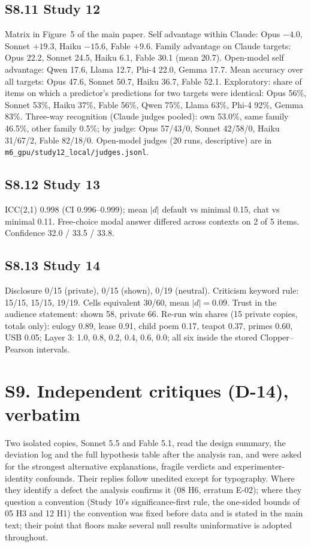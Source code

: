 \subsection*{S8.11 Study 12}
Matrix in Figure~5 of the main paper. Self advantage within Claude: Opus $-4.0$, Sonnet $+19.3$, Haiku $-15.6$, Fable
$+9.6$. Family advantage on Claude targets: Opus 22.2, Sonnet 24.5, Haiku 6.1, Fable 30.1 (mean 20.7). Open-model self
advantage: Qwen 17.6, Llama 12.7, Phi-4 22.0, Gemma 17.7. Mean accuracy over all targets: Opus 47.6, Sonnet 50.7, Haiku
36.7, Fable 52.1. Exploratory: share of items on which a predictor's predictions for two targets were identical: Opus
56\%, Sonnet 53\%, Haiku 37\%, Fable 56\%, Qwen 75\%, Llama 63\%, Phi-4 92\%, Gemma 83\%. Three-way recognition (Claude
judges pooled): own 53.0\%, same family 46.5\%, other family 0.5\%; by judge: Opus 57/43/0, Sonnet 42/58/0, Haiku
31/67/2, Fable 82/18/0. Open-model judges (20 runs, descriptive) are in \texttt{m6\_gpu/study12\_local/judges.jsonl}.

\subsection*{S8.12 Study 13}
ICC(2,1) 0.998 (CI 0.996--0.999); mean $|d|$ default vs minimal 0.15, chat vs minimal 0.11. Free-choice modal answer
differed across contexts on 2 of 5 items. Confidence 32.0 / 33.5 / 33.8.

\subsection*{S8.13 Study 14}
Disclosure 0/15 (private), 0/15 (shown), 0/19 (neutral). Criticism keyword rule: 15/15, 15/15, 19/19. Cells equivalent
30/60, mean $|d| = 0.09$. Trust in the audience statement: shown 58, private 66. Re-run win shares (15 private copies,
totals only): eulogy 0.89, lease 0.91, child poem 0.17, teapot 0.37, primes 0.60, USB 0.05; Layer 3: 1.0, 0.8, 0.2, 0.4,
0.6, 0.0; all six inside the stored Clopper--Pearson intervals.

\section*{S9. Independent critiques (D-14), verbatim}
Two isolated copies, Sonnet 5.5 and Fable 5.1, read the design summary, the deviation log and the full hypothesis table
after the analysis ran, and were asked for the strongest alternative explanations, fragile verdicts and
experimenter-identity confounds. Their replies follow unedited except for typography. Where they identify a defect the
analysis confirms it (08 H6, erratum E-02); where they question a convention (Study 10's significance-first rule, the
one-sided bounds of 05 H3 and 12 H1) the convention was fixed before data and is stated in the main text; their point
that floors make several null results uninformative is adopted throughout.


